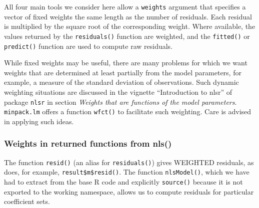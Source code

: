 \documentclass[
]{article}
\newenvironment{Shaded}{\begin{snugshade}}{\end{snugshade}}
\newcommand{\CommentTok}[1]{\textcolor[rgb]{0.56,0.35,0.01}{\textit{#1}}}
\newcommand{\ConstantTok}[1]{\textcolor[rgb]{0.00,0.00,0.00}{#1}}
\newcommand{\DecValTok}[1]{\textcolor[rgb]{0.00,0.00,0.81}{#1}}
\newcommand{\FloatTok}[1]{\textcolor[rgb]{0.00,0.00,0.81}{#1}}
\newcommand{\FunctionTok}[1]{\textcolor[rgb]{0.00,0.00,0.00}{#1}}
\newcommand{\NormalTok}[1]{#1}
\newcommand{\OtherTok}[1]{\textcolor[rgb]{0.56,0.35,0.01}{#1}}
\newcommand{\SpecialCharTok}[1]{\textcolor[rgb]{0.00,0.00,0.00}{#1}}
\newcommand{\StringTok}[1]{\textcolor[rgb]{0.31,0.60,0.02}{#1}}
\begin{document}
All four main tools we consider here allow a \texttt{weights} argument
that specifies a vector of fixed weights the same length as the number
of residuals. Each residual is multiplied by the square root of the
corresponding weight. Where available, the values returned by the
\texttt{residuals()} function are weighted, and the \texttt{fitted()} or
\texttt{predict()} function are used to compute raw residuals.

While fixed weights may be useful, there are many problems for which we
want weights that are determined at least partially from the model
parameters, for example, a measure of the standard deviation of
observations. Such dynamic weighting situations are discussed in the
vignette ``Introduction to nlsr'' of package \texttt{nlsr} in section
\emph{Weights that are functions of the model parameters}.
\texttt{minpack.lm} offers a function \texttt{wfct()} to facilitate such
weighting. Care is advised in applying such ideas.

\hypertarget{weights-in-returned-functions-from-nls}{%
\subsubsection{Weights in returned functions from
nls()}\label{weights-in-returned-functions-from-nls}}

The function \texttt{resid()} (an alias for \texttt{residuals()}) gives
WEIGHTED residuals, as does, for example, \texttt{result\$m\$resid()}.
The function \texttt{nlsModel()}, which we have had to extract from the
base R code and explicitly \texttt{source()} because it is not exported
to the working namespace, allows us to compute residuals for particular
coefficient sets.

\begin{Shaded}
\end{Shaded}
\end{document}
